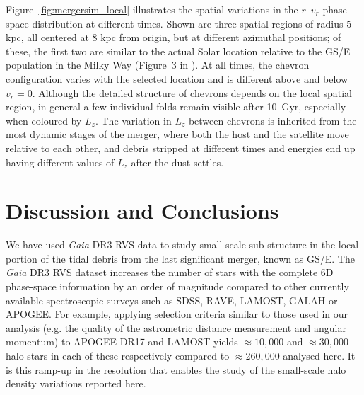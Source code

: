 \documentclass[a4paper,useAMS,usenatbib]{mnras}
\begin{document}
Figure~\ref{fig:mergersim_local} illustrates the spatial variations in the $r$--$v_r$ phase-space distribution at different times. Shown are three spatial regions of radius 5 kpc, all centered at 8 kpc from origin, but at different azimuthal positions; of these, the first two are similar to the actual Solar location relative to the GS/E population in the Milky Way (Figure~3 in \citealt{Iorio2019}). At all times, the chevron configuration varies with the selected location and is different above and below $v_r=0$. Although the detailed structure of chevrons depends on the local spatial region, in general a few individual folds remain visible after 10~Gyr, especially when coloured by $L_z$. The variation in $L_z$ between chevrons is inherited from the most dynamic stages of the merger, where both the host and the satellite move relative to each other, and debris stripped at different times and energies end up having different values of $L_z$ after the dust settles.


\section{Discussion and Conclusions}
\label{sec:conc}

We have used {\it Gaia} DR3 RVS data to study small-scale sub-structure in the local portion of the tidal debris from the last significant merger, known as GS/E. The {\it Gaia} DR3 RVS dataset increases the number of stars with the complete 6D phase-space information by an order of magnitude compared to other currently available spectroscopic surveys such as SDSS, RAVE, LAMOST, GALAH or APOGEE. For example, applying selection criteria similar to those used in our analysis (e.g. the quality of the astrometric distance measurement and angular momentum) to APOGEE DR17 and LAMOST yields $\approx10,000$ and $\approx30,000$ halo stars in each of these respectively compared to $\approx260,000$ analysed here.  It is this ramp-up in the resolution that enables the study of the small-scale halo density variations reported here. 
\end{document}
